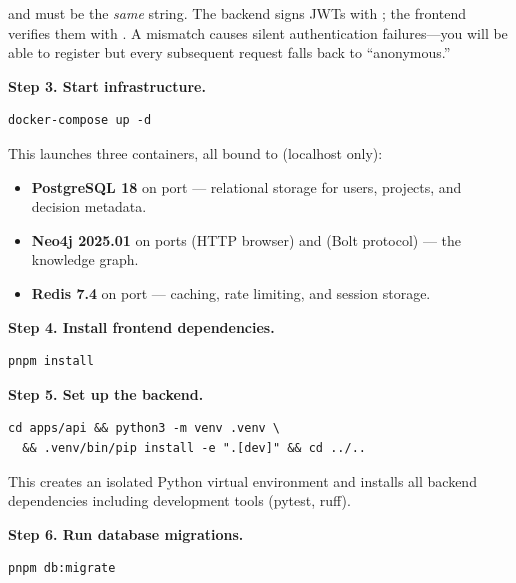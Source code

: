 \begin{warning}
 and  must be the \emph{same}
string.  The backend signs JWTs with ; the frontend
verifies them with .  A mismatch causes silent
authentication failures---you will be able to register but every subsequent
request falls back to ``anonymous.''
\end{warning}

\noindent\textbf{Step 3.  Start infrastructure.}

\begin{lstlisting}[style=bash, numbers=none]
docker-compose up -d
\end{lstlisting}

This launches three containers, all bound to  (localhost only):

\begin{itemize}
    \item \textbf{PostgreSQL 18} on port  --- relational storage for
          users, projects, and decision metadata.
    \item \textbf{Neo4j 2025.01} on ports  (HTTP browser) and
           (Bolt protocol) --- the knowledge graph.
    \item \textbf{Redis 7.4} on port  --- caching, rate limiting, and
          session storage.
\end{itemize}

\noindent\textbf{Step 4.  Install frontend dependencies.}

\begin{lstlisting}[style=bash, numbers=none]
pnpm install
\end{lstlisting}

\noindent\textbf{Step 5.  Set up the backend.}

\begin{lstlisting}[style=bash, numbers=none]
cd apps/api && python3 -m venv .venv \
  && .venv/bin/pip install -e ".[dev]" && cd ../..
\end{lstlisting}

This creates an isolated Python virtual environment and installs all backend
dependencies including development tools (pytest, ruff).

\noindent\textbf{Step 6.  Run database migrations.}

\begin{lstlisting}[style=bash, numbers=none]
pnpm db:migrate
\end{lstlisting}

